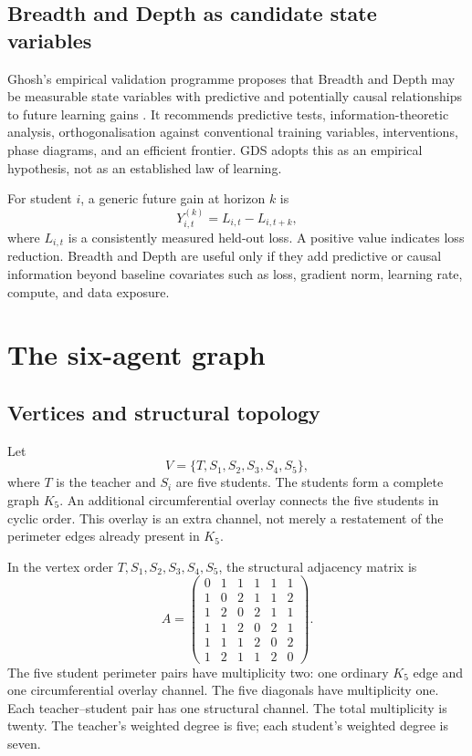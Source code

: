\documentclass[11pt,a4paper]{article}
\begin{document}
\subsection{Breadth and Depth as candidate state variables}

Ghosh's empirical validation programme proposes that Breadth and Depth may be measurable state variables with predictive and potentially causal relationships to future learning gains \cite{ghosh2026empirical}. It recommends predictive tests, information-theoretic analysis, orthogonalisation against conventional training variables, interventions, phase diagrams, and an efficient frontier. GDS adopts this as an empirical hypothesis, not as an established law of learning.

For student \(i\), a generic future gain at horizon \(k\) is
\begin{equation}
Y_{i,t}^{(k)}=L_{i,t}-L_{i,t+k},
\end{equation}
where \(L_{i,t}\) is a consistently measured held-out loss. A positive value indicates loss reduction. Breadth and Depth are useful only if they add predictive or causal information beyond baseline covariates such as loss, gradient norm, learning rate, compute, and data exposure.

\section{The six-agent graph}

\subsection{Vertices and structural topology}

Let
\begin{equation}
V=\{T,S_1,S_2,S_3,S_4,S_5\},
\end{equation}
where \(T\) is the teacher and \(S_i\) are five students. The students form a complete graph \(K_5\). An additional circumferential overlay connects the five students in cyclic order. This overlay is an extra channel, not merely a restatement of the perimeter edges already present in \(K_5\).

In the vertex order \(T,S_1,S_2,S_3,S_4,S_5\), the structural adjacency matrix is
\begin{equation}
A=
\begin{pmatrix}
0&1&1&1&1&1\\
1&0&2&1&1&2\\
1&2&0&2&1&1\\
1&1&2&0&2&1\\
1&1&1&2&0&2\\
1&2&1&1&2&0
\end{pmatrix}.
\end{equation}
The five student perimeter pairs have multiplicity two: one ordinary \(K_5\) edge and one circumferential overlay channel. The five diagonals have multiplicity one. Each teacher--student pair has one structural channel. The total multiplicity is twenty. The teacher's weighted degree is five; each student's weighted degree is seven.
\end{document}
